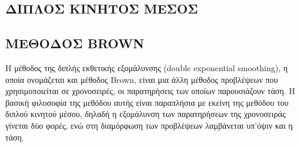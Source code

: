 \subsection{ΔΙΠΛΟΣ ΚΙΝΗΤΟΣ ΜΕΣΟΣ}

\subsection{ΜΕΘΟΔΟΣ BROWN}
Η μέθοδος της διπλής εκθετικής εξομάλυνσης (double exponential smoothing), η
οποία ονομάζεται και μέθοδος Brown, είναι μια άλλη μέθοδος προβλέψεων που
χρησιμοποιείται σε χρονοσειρές, οι παρατηρήσεις των οποίων παρουσιάζουν τάση. Η
βασική φιλοσοφία της μεθόδου αυτής είναι παραπλήσια με εκείνη της μεθόδου του
διπλού κινητού μέσου, δηλαδή η εξομάλυνση των παρατηρήσεων της χρονοσειράς
γίνεται δύο φορές, ενώ στη διαμόρφωση των προβλέψεων λαμβάνεται υπ’όψιν και η
τάση.\\

